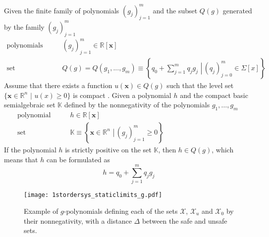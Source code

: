  
\vspace{-2mm}
\begin{thm}\label{def:putinar}
Given the finite family of polynomials $(g_j)_{j=1}^m$ and the subset $Q(g)$ %
generated by the family $(g_j)_{j=1}^m$ \citep[p 29]{bib:sos_putinar_lasserre}
\begin{subequations}\label{eq:putinar}
\begin{align}
\text{polynomials} \qquad & (g_j)_{j=1}^m \in\mathbb{R}[\mathbf{x}]\label{eq:polynomials_g}\\
\text{set} \qquad & Q(g)=Q(g_1,...,g_m)\equiv\left\{\left.q_0+\sum\limits_{j=1}^{m}q_jg_j\,\,\right| \, (q_j)_{j=0}^m\in\Sigma[x]\right\}\label{eq:putinar_set_sos}
\end{align}
\end{subequations}
Assume that there exists a function $u(\mathbf{x})\in Q(g)$ such that the level set $\{\mathbf{x}\in\mathbb{R}^n \,\,|\,\, u(x)\geq 0\}$ is compact \citep[p 29]{bib:sos_putinar_lasserre}.
Given a polynomial $h$ and the compact basic semialgebraic set $\mathbb{K}$  defined by the nonnegativity of the polynomials $g_1,\dots, g_m$  
\begin{subequations}
\begin{align}
\text{polynomial} \qquad & h \in\mathbb{R}[\mathbf{x}]\\
\text{set} \qquad & \mathbb{K}\equiv\left\{\left.\mathbf{x}\in \mathbb{R}^n\,\, \right| \, (g_j)_{j=1}^m\geq0\right\}\qquad\qquad\qquad\qquad\qquad\quad\label{eq:setK}
\end{align}
\end{subequations}
If the polynomial $h$ is strictly positive on the set $\mathbb{K}$, then $h\in Q(g)$, which means that $h$  can be formulated as
\begin{equation}\label{eq:sos_barrier}
h = q_0+\sum\limits_{j=1}^{m}q_jg_j
\end{equation}
\end{thm}

\vspace{-16mm}
\begin{figure}[H]
\centering
\texttt{[image: 1stordersys\_staticlimits\_g.pdf]}
\caption{Example of $g$-polynomials defining each of the sets $\mathcal{X}$, $\mathcal{X}_u$ and $\mathcal{X}_0$ by their nonnegativity, with a distance $\Delta$ between the safe and unsafe sets.}
\label{fig:1stordersys_staticlimits_g}
\end{figure}

